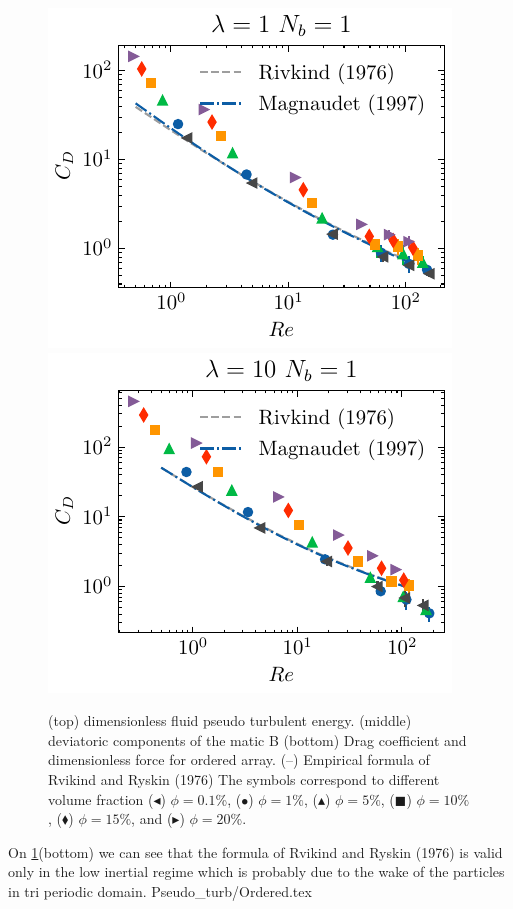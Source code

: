 \begin{figure}[h!]
    \includegraphics[height = 0.35\textwidth]{image/HOMOGENEOUS/fCA/Cp_N_1_l_1.pdf}
    \includegraphics[height = 0.35\textwidth]{image/HOMOGENEOUS/fCA/Cp_N_1_l_10.pdf}
    \caption{
        (top) dimensionless fluid pseudo turbulent energy. 
        (middle) deviatoric components of the matic B
        (bottom) 
        Drag coefficient and dimensionless force for ordered array. 
        (--) Empirical formula of Rvikind and Ryskin (1976)
        The symbols correspond to different volume fraction ($\blacktriangleleft$) $\phi = 0.1$\%, ($\bullet$) $\phi = 1\%$, ($\blacktriangle$) $\phi = 5\%$, ($\blacksquare$) $\phi = 10\%$, ($\blacklozenge$) $\phi = 15\%$, and ($\blacktriangleright$) $\phi = 20$\%.
    }
    \label{fig:Cp}
\end{figure}


On \ref{fig:Cp}(bottom) we can see that the formula of Rvikind and Ryskin (1976) is valid only in the low inertial regime which is probably due to the wake of the particles in tri periodic domain. Pseudo_turb/Ordered.tex